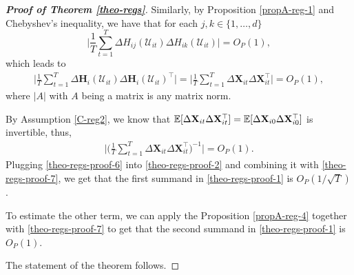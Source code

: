 \documentclass[a4paper,12pt]{article}
\begin{document}
\begin{proof}[\textnormal{\textbf{Proof of Theorem \ref{theo-regs}}}]
Similarly, by Proposition \ref{propA-reg-1} and Chebyshev's inequality, we have that for each \linebreak $j, k\in\{1, \ldots, d\}$
\[  \Big|\frac{1}{T}\sum_{t=1}^T \Delta H_{ij}(\mathcal{U}_{it}) \Delta H_{ik}(\mathcal{U}_{it})\Big| = O_P(1),
\]
which leads to 
\begin{align*}
\Big| \frac{1}{T}\sum_{t=1}^T \Delta \mathbf{H}_i (\mathcal{U}_{it})\Delta \mathbf{H}_i (\mathcal{U}_{it})^\top \Big| =\Big|\frac{1}{T}\sum_{t=1}^T\Delta \mathbf{X}_{it} \Delta \mathbf{X}_{it}^\top\Big| = O_P(1),
\end{align*}
where $|A|$ with $A$ being a matrix is any matrix norm.

By Assumption \ref{C-reg2}, we know that $\mathbb{E} [\Delta \mathbf{X}_{it} \Delta \mathbf{X}_{it}^\top] = \mathbb{E} [\Delta \mathbf{X}_{i0} \Delta \mathbf{X}_{i0}^\top]$ is invertible, thus, 
\begin{align}\label{theo-regs-proof-7}
\Bigg|  \Big(\frac{1}{T}\sum_{t=1}^T\Delta \mathbf{X}_{it} \Delta \mathbf{X}_{it}^\top\Big)^{-1}\Bigg| = O_P(1).
\end{align}
Plugging \eqref{theo-regs-proof-6} into \eqref{theo-regs-proof-2} and combining it with \eqref{theo-regs-proof-7}, we get that the first  summand in \eqref{theo-regs-proof-1} is $O_P(1/\sqrt{T})$.

To estimate the other term, we can apply the Proposition \ref{propA-reg-4} together with \eqref{theo-regs-proof-7} to get that the second summand in \eqref{theo-regs-proof-1} is $O_P(1)$.

The statement of the theorem follows.
\end{proof}
\end{document}
